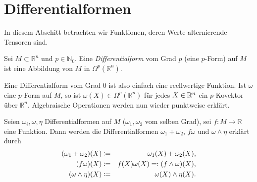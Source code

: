 \documentclass[a4paper,twoside,DIV15,BCOR12mm]{scrbook}
\begin{document}
\section{Differentialformen}


In diesem Abschitt betrachten wir Funktionen, 
deren Werte alternierende Tensoren sind.

\bigskip

 Sei $M \subset {\mathbb R}^{n}$ und $p \in {\mathbb N}_{0}$. 
Eine {\em Differentialform} vom Grad $p$ (eine $p$-Form) auf $M$ 
ist eine Abbildung von $M$ in $\Omega^{p}({\mathbb R}^{n})$.

\bigskip

\noindent
Eine Differentialform vom Grad 0 ist also einfach eine reellwertige Funktion. 
Ist $\omega$ eine $p$-Form auf $M$, so ist $\omega(X) \in \Omega^{p}
({\mathbb R}^{n})$ für jedes $X\in\mathbb{R}^n$
 ein $p$-Kovektor über ${\mathbb R}^{n}$. Algebraische Operationen werden nun wieder 
 punktweise erklärt.
 
\bigskip

 Seien $\omega_{i},\omega,\eta$ Differentialformen auf $M$ ($\omega_{1},\omega_{2}$ vom selben Grad), sei $f: M \to {\mathbb R}$ eine Funktion. 
Dann werden die Differentialformen $\omega_{1} + \omega_{2}$, $f\omega$ und $\omega \wedge \eta$ erklärt durch
\begin{eqnarray*}
(\omega_{1} + \omega_{2})(X) & \da  & \omega_{1}(X) + \omega_{2}(X), \\
(f\omega) (X) & \da  & f(X)\omega(X) =: (f \wedge \omega)(X), \\
(\omega \wedge \eta)(X) & \da  & \omega(X) \wedge \eta(X). 
\end{eqnarray*}

\bigskip
\end{document}
